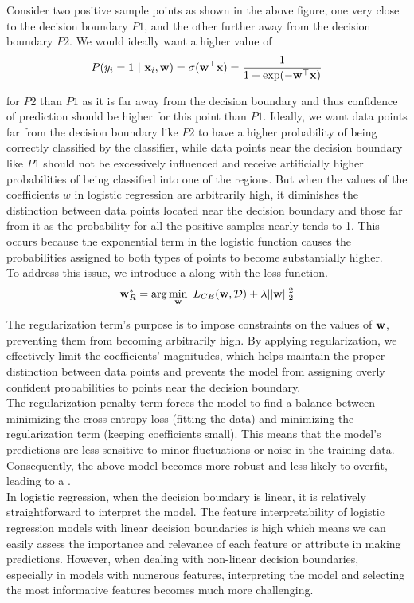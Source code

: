 Consider two positive sample points as shown in the above figure, one very close to the decision boundary $P1$, and the other further away from the decision boundary $P2$. We would ideally want a higher value of
$$
  P(y_i = 1 \ | \  \textbf{x}_i,\textbf{w}) = \sigma(\textbf{w}^\top \textbf{x}) = \frac{1}{1+\exp(-\textbf{w}^\top\textbf{x})}
$$

for $P2$ than $P1$ as it is far away from the decision boundary and thus confidence of prediction should be higher for this point than $P1$. Ideally, we want data points far from the decision boundary like $P2$ to have a higher probability of being correctly classified by the classifier, while data points near the decision boundary like $P1$ should not be excessively influenced and receive artificially higher probabilities of being classified into one of the regions. But when the values of the coefficients $w$ in logistic regression are arbitrarily high, it diminishes the distinction between data points located near the decision boundary and those far from it as the probability for all the positive samples nearly tends to 1. This occurs because the exponential term in the logistic function causes the probabilities assigned to both types of points to become substantially higher.  \\

To address this issue, we introduce a  along with the loss function.
$$
  \tc{w}^*_R = \arg\min_{\tc{w}} \ L_{CE}(\tc{w}, \D) + \lambda||\tc{w}||^2_2
$$

The regularization term's purpose is to impose constraints on the values of $\textbf{w}$, preventing them from becoming arbitrarily high. By applying regularization, we effectively limit the coefficients' magnitudes, which helps maintain the proper distinction between data points and prevents the model from assigning overly confident probabilities to points near the decision boundary. \\

The regularization penalty term forces the model to find a balance between minimizing the cross entropy loss (fitting the data) and minimizing the regularization term (keeping coefficients small). This means that the model's predictions are less sensitive to minor fluctuations or noise in the training data. Consequently, the above model becomes more robust and less likely to overfit, leading to a . \\

In logistic regression, when the decision boundary is linear, it is relatively straightforward to interpret the model. The feature interpretability of logistic regression models with linear decision boundaries is high which means we can easily assess the importance and relevance of each feature or attribute in making predictions. However, when dealing with non-linear decision boundaries, especially in models with numerous features, interpreting the model and selecting the most informative features becomes much more challenging. \\


